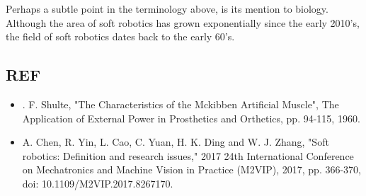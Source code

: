 Perhaps a subtle point in the terminology above, is its mention to biology.
Although the area of soft robotics has grown exponentially since the early 2010's, the field of soft robotics dates back to the early 60's.

% 


\subsection{REF}

\begin{itemize}
  \item . F. Shulte, "The Characteristics of the Mckibben Artificial Muscle", The Application of External Power in Prosthetics and Orthetics, pp. 94-115, 1960.
  \item A. Chen, R. Yin, L. Cao, C. Yuan, H. K. Ding and W. J. Zhang, "Soft robotics: Definition and research issues," 2017 24th International Conference on Mechatronics and Machine Vision in Practice (M2VIP), 2017, pp. 366-370, doi: 10.1109/M2VIP.2017.8267170.
\end{itemize}
